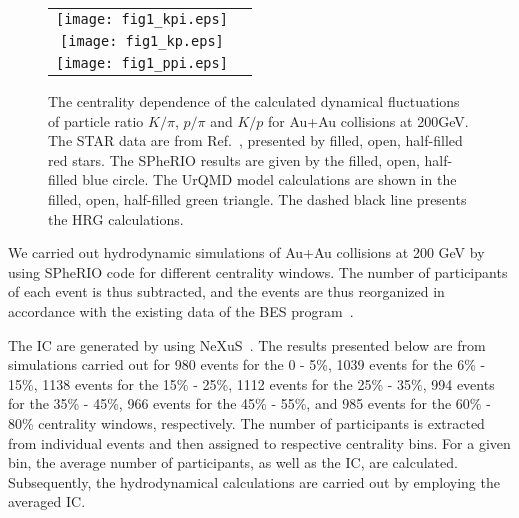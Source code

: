 \documentclass[secnumarabic, graphics,floatfix, nofootinbib,tightenlines,nobibnotes, aps, prl, 12pt]{revtex4-1}
\begin{document}
\begin{figure}[htb]
\begin{tabular}{cc}
\begin{minipage}{300pt}
\centerline{\texttt{[image: fig1\_kpi.eps]}}
\end{minipage}
\\
\begin{minipage}{300pt}
\centerline{\texttt{[image: fig1\_kp.eps]}}
\end{minipage}
\\
\begin{minipage}{300pt}
\centerline{\texttt{[image: fig1\_ppi.eps]}}
\end{minipage}
\end{tabular}
\caption{The centrality dependence of the calculated dynamical fluctuations of particle ratio $K/ \pi$, $p/ \pi$ and $K/p$ for Au+Au collisions at 200GeV. The STAR data are from Ref.~\cite{RHIC-star-mul-fluctuations-03}, presented by filled, open, half-filled red stars. 
The SPheRIO results are given by the filled, open, half-filled blue circle.
The UrQMD model calculations are shown in the filled, open, half-filled green triangle.
The dashed black line presents the HRG calculations.
 }\label{nudyn}
\end{figure}

We carried out hydrodynamic simulations of Au+Au collisions at 200 GeV by using SPheRIO code for different centrality windows.
The number of participants of each event is thus subtracted, and the events are thus reorganized in accordance with the existing data of the BES program~\cite{RHIC-star-mul-fluctuations-03, RHIC-star-mul-fluctuations-04}.

The IC are generated by using NeXuS~\cite{nexus-1,nexus-rept}.
The results presented below are from simulations carried out for 980 events for the 0 - 5\%, 1039 events for the 6\% - 15\%, 1138 events for the 15\% - 25\%, 1112 events for the 25\% - 35\%, 994 events for the 35\% - 45\%, 966 events for the 45\% - 55\%, and 985 events for the 60\% - 80\% centrality windows, respectively.
The number of participants is extracted from individual events and then assigned to respective centrality bins.
For a given bin, the average number of participants, as well as the IC, are calculated.
Subsequently, the hydrodynamical calculations are carried out by employing the averaged IC.
\end{document}
